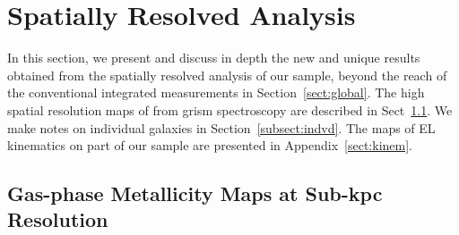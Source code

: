 \section{Spatially Resolved Analysis}\label{sect:sra}

In this section, we present and discuss in depth the new and unique results obtained from the spatially resolved analysis of our
sample, beyond the reach of the conventional integrated measurements in Section~\ref{sect:global}.
The high spatial resolution maps of \gpm from \hst grism spectroscopy are described in Sect~\ref{subsect:oh12grad}.
We make notes on individual galaxies in Section~\ref{subsect:indvd}.
The maps of EL kinematics on part of our sample are presented in Appendix~\ref{sect:kinem}.

\subsection{Gas-phase Metallicity Maps at Sub-kpc Resolution}\label{subsect:oh12grad}



